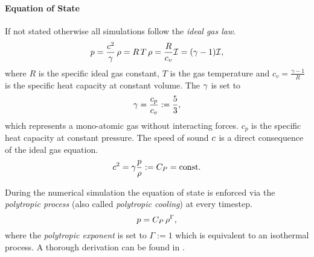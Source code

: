 \paragraph{Equation of State}
If not stated otherwise all simulations follow the \emph{ideal gas law}.
\begin{equation}
p = \frac{c^2}{\gamma} \, \rho = R\,T\,\rho = \frac{R}{c_v} \mathcal{I} = (\gamma - 1) \mathcal{I},
\end{equation}
where $R$ is the specific ideal gas constant, $T$ is the gas temperature and $c_v
= \frac{\gamma - 1}{R}$ is the specific heat capacity at constant volume. 
The  $\gamma$ is set to
\begin{equation}
\label{eqn:adiabconst}
    \gamma = \frac{c_p}{c_v} := \frac{5}{3},
\end{equation}
which represents a mono-atomic gas without interacting forces. $c_p$ is the
specific heat capacity at constant pressure.
The speed of sound $c$ is a direct consequence of the ideal gas
equation.  \begin{equation} c^2 = \gamma \frac{p}{\rho} := C_P = \text{const.} \end{equation}

During the numerical simulation the equation of state is enforced via the
\emph{polytropic process} (also called \emph{polytropic cooling}) at
every timestep.
\begin{equation}
p = C_P \, \rho^\Gamma,
\end{equation}
where the \emph{polytropic exponent} is set to $\Gamma := 1$ which is
equivalent to an isothermal process. A thorough derivation can be found in
\cite[p. 2 ff.]{horedt2004polytropes}.


